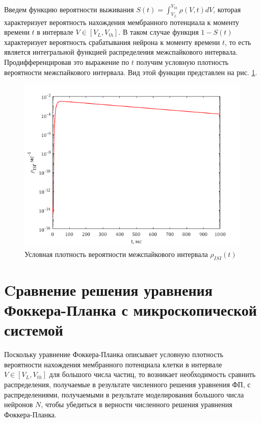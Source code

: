 Введем функцию вероятности выживания $\displaystyle S(t)=\int_{V_L}^{V_{th}}\rho(V,t)dV$, которая характеризует вероятность нахождения мембранного потенциала к моменту времени $t$ в интервале $V\in[V_L, V_{th}]$. В таком случае функция $1-S(t)$ характеризует вероятность срабатывания нейрона к моменту времени $t$, то есть является интегральной функцией распределения межспайкового интервала. Продифференцировав это выражение по $t$ получим условную плотность вероятности межспайкового интервала. Вид этой функции представлен на рис. \ref{pic:2}.
\begin{figure}[H]
	\centering
	\includegraphics[width=\linewidth]{pic/S.png}
	\caption{Условная плотность вероятности межспайкового интервала $\rho_{ISI}(t)$}
	\label{pic:2}
\end{figure}
\section{Cравнение решения уравнения Фоккера-Планка с микроскопической системой}
Поскольку уравнение Фоккера-Планка описывает условную плотность вероятности нахождения мембранного потенциала клетки в интервале $V\in[V_L, V_{th}]$ для большого числа частиц, то возникает необходимость сравнить распределения, получаемые в результате численного решения уравнения ФП, с распределениями, получаемыми в результате моделирования большого числа нейронов $N$, чтобы убедиться в верности численного решения уравнения Фоккера-Планка. 

